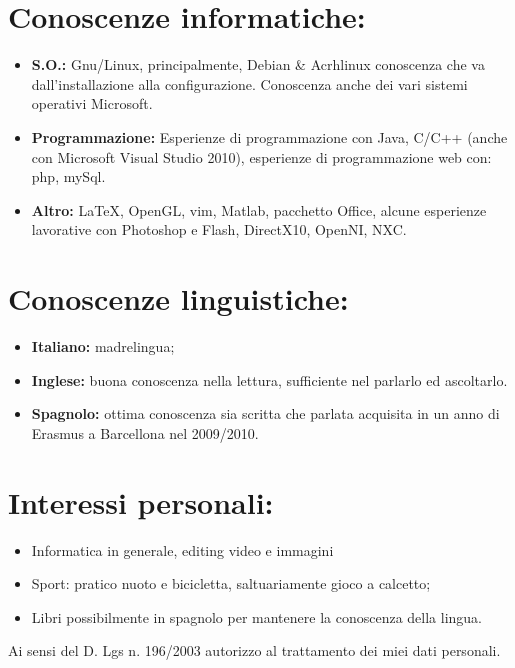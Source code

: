 \documentclass[pdftex,a4paper,12pt,twoside,titlepage,italian,openright]{article}
\begin{document}
\section*{Conoscenze informatiche:}
\begin{itemize}
	\item \textbf{S.O.:} Gnu/Linux, principalmente, Debian \& Acrhlinux conoscenza 
	che va dall'installazione alla configurazione. Conoscenza anche dei vari 
	sistemi operativi Microsoft.
	\item \textbf{Programmazione: } Esperienze di programmazione con 
	Java, C/C++ (anche con Microsoft Visual Studio 2010),
	esperienze di programmazione web con: php, mySql. 
	\item \textbf{Altro: }\LaTeX, OpenGL, vim, Matlab, pacchetto Office,
	alcune esperienze lavorative con Photoshop e Flash, DirectX10, OpenNI,
	NXC.
\end{itemize}
\section*{Conoscenze linguistiche:}
\begin{itemize}
	\item \textbf{Italiano:} madrelingua;
	\item \textbf{Inglese:} buona conoscenza nella lettura, sufficiente nel parlarlo ed 
	ascoltarlo.
	\item \textbf{Spagnolo:} ottima conoscenza sia scritta che parlata acquisita in un anno
	di Erasmus a Barcellona nel 2009/2010.
\end{itemize}
\section*{Interessi personali: }
\begin{itemize}
	\item Informatica in generale, editing video e immagini
	\item Sport: pratico nuoto e bicicletta, saltuariamente gioco a calcetto;
	\item Libri possibilmente in spagnolo per mantenere la conoscenza della lingua.
\end{itemize}
\vfill
Ai sensi del D. Lgs n. 196/2003 autorizzo al trattamento dei miei dati personali.
\vspace{1cm}
\end{document}
